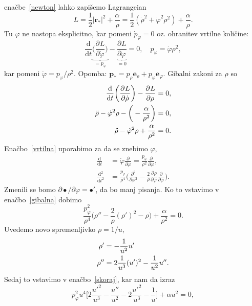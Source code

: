 \documentclass[12pt, a4paper]{article}
\renewcommand{\r}{
    \ensuremath{\mathbf{r}}
}
\newcommand{\p}{
    \ensuremath{\mathbf{p}}
}
\newcommand{\ee}{
    \ensuremath{\mathbf{e}}
}
\newcommand{\der}[3][]{
    \ensuremath{ \frac{\partial^{#1} #2}{\partial #3^{#1}} }
}
\renewcommand{\d}{
    \ensuremath{\mathrm{d}}
}
\begin{document}
ena\v cbe~\eqref{newton} lahko zapi\v semo Lagrangeian
\begin{equation*}
    L = \frac{1}{2}|\dot{\r}_*|^2 + \frac{\alpha}{\rho} = \frac{1}{2}(\dot{\rho}^2 + \dot{\varphi}^2\rho^2) +
        \frac{\alpha}{\rho}.
\end{equation*}
Tu $\varphi$ ne nastopa eksplicitno, kar pomeni $\dot{p}_\varphi = 0$ oz. ohranitev vrtilne koli\v cine:
\begin{equation}
    \frac{\d}{\d t}\underbrace{\bigg(\der{L}{\dot{\varphi}}\bigg)}_{= p_\varphi} -
        \underbrace{\der{L}{\varphi}}_{= 0} = 0, \quad p_\varphi = \dot{\varphi}\rho^2,
    \label{vrtilna}
\end{equation}
kar pomeni $\dot{\varphi} = p_\varphi/\rho^2$. Opomba: $\p_* = p_\rho\ee_\rho + p_\varphi\ee_\varphi$. Gibalni zakoni
za $\rho$ so
\begin{align}
    \frac{\d}{\d t}\bigg(\der{L}{\dot{\rho}}\bigg) - \der{L}{\rho} &= 0, \notag \\
    \ddot{\rho} - \dot{\varphi}^2\rho - \bigg(-\frac{\alpha}{\rho^2}\bigg) &= 0, \notag \\
    \ddot{\rho} - \dot{\varphi}^2\rho + \frac{\alpha}{\rho^2} &= 0.
    \label{gibalna}
\end{align}
Ena\v cbo~\eqref{vrtilna} uporabimo za da se znebimo $\varphi$,
\begin{align}
    \frac{\d}{\d t} &= \dot{\varphi}\der{}{\varphi} = \frac{p_\varphi}{\rho^2}\der{}{\varphi}, \\
    \frac{\d^2}{\d t^2} &= \frac{p_\varphi}{\rho^4}\bigg(\der[2]{}{\varphi} - \frac{2}{\rho}\der{\rho}{\varphi}
        \der{}{\varphi}\bigg).
\end{align}
Zmenili se bomo $\partial \bullet/\partial \varphi = \bullet'$, da bo manj pisanja. Ko to vstavimo v
ena\v cbo~\eqref{gibalna} dobimo
\begin{equation}
    \frac{p^2_\varphi}{\rho^4}\bigg(\rho'' - \frac{2}{\rho}(\rho')^2 - \rho\bigg) + \frac{\alpha}{\rho^2} = 0.
    \label{skoraj}
\end{equation}
Uvedemo novo spremenljivko $\rho = 1/u$,
\begin{align}
    \rho' &= -\frac{1}{u^2}u' \notag \\
    \rho'' &= 2\frac{1}{u^3}(u')^2 - \frac{1}{u^2}u''.
\end{align}
Sedaj to vstavimo v ena\v cbo~\eqref{skoraj}, kar nam da izraz
\begin{equation*}
    p^2_\varphi u^4\bigg[2\frac{u'^2}{u^3} - \frac{u''}{u^2} - 2\frac{u'^2}{u^3} - \frac{1}{u}\bigg] + \alpha u^2 = 0,
\end{equation*}
\end{document}
